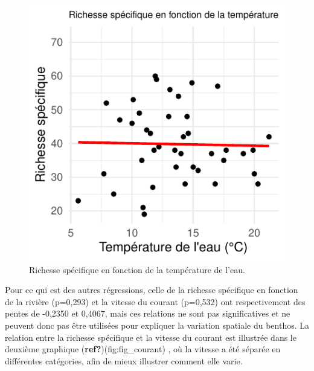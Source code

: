 \documentclass[9pt,twocolumn,twoside,]{pnas-new}
\begin{document}
\begin{figure}

{\centering \includegraphics{RMarkdown-article_files/figure-latex/fig_temperature-1} 

}

\caption{Richesse spécifique en fonction de la température de l'eau.}\label{fig:fig_temperature}
\end{figure}

Pour ce qui est des autres régressions, celle de la richesse spécifique
en fonction de la rivière (p=0,293) et la vitesse du courant (p=0,532)
ont respectivement des pentes de -0,2350 et 0,4067, mais ces relations
ne sont pas significatives et ne peuvent donc pas être utilisées pour
expliquer la variation spatiale du benthos. La relation entre la
richesse spécifique et la vitesse du courant est illustrée dans le
deuxième graphique (\textbf{ref?})(fig:fig\_courant) , où la vitesse a
été séparée en différentes catégories, afin de mieux illustrer comment
elle varie.
\end{document}
